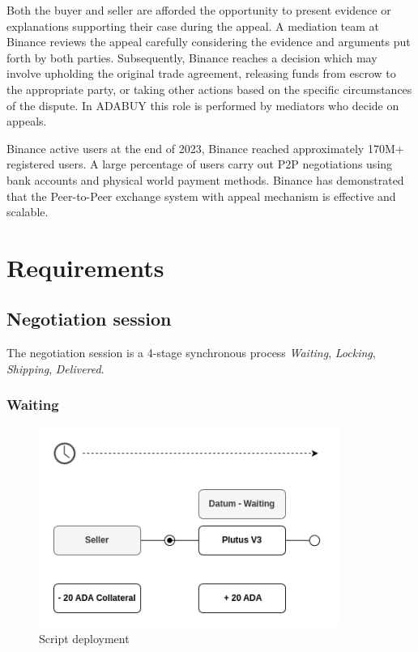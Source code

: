 \documentclass[12pt]{article}
\begin{document}
Both the buyer and seller are afforded the opportunity to present evidence or explanations supporting their case during the appeal. A mediation team at Binance reviews the appeal carefully considering the evidence and arguments put forth by both parties. Subsequently, Binance reaches a decision which may involve upholding the original trade agreement, releasing funds from escrow to the appropriate party, or taking other actions based on the specific circumstances of the dispute. In ADABUY this role is performed by mediators who decide on appeals.

Binance active users at the end of 2023, Binance reached approximately 170M+ registered users. A large percentage of users carry out P2P negotiations using bank accounts and physical world payment methods. Binance has demonstrated that the Peer-to-Peer exchange system with appeal mechanism is effective and scalable.


\section{ Requirements }

\subsection { Negotiation session }

The negotiation session is a 4-stage synchronous process \emph{Waiting}, \emph{Locking}, \emph{Shipping}, \emph{Delivered}.

\subsubsection { Waiting }

\begin{figure}[ht]
  \centering
  \includegraphics[width=0.88\textwidth, keepaspectratio]{1.png}
  \caption{Script deployment}
  \label{fig:mi_imagen}
\end{figure}
\end{document}
